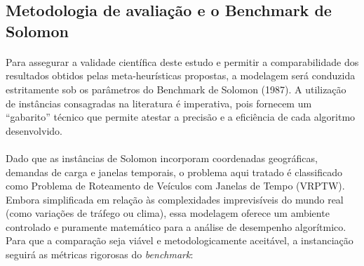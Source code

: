 \subsection{Metodologia de avaliação e o Benchmark de Solomon}
\label{sec:benchmark}

\paragraph{}Para assegurar a validade científica deste estudo e permitir a comparabilidade dos resultados obtidos pelas meta-heurísticas propostas, a modelagem será conduzida estritamente sob os parâmetros do Benchmark de Solomon (1987). A utilização de instâncias consagradas na literatura é imperativa, pois fornecem um ``gabarito'' técnico que permite atestar a precisão e a eficiência de cada algoritmo desenvolvido.

\paragraph{}Dado que as instâncias de Solomon incorporam coordenadas geográficas, demandas de carga e janelas temporais, o problema aqui tratado é classificado como Problema de Roteamento de Veículos com Janelas de Tempo (VRPTW). Embora simplificada em relação às complexidades imprevisíveis do mundo real (como variações de tráfego ou clima), essa modelagem oferece um ambiente controlado e puramente matemático para a análise de desempenho algorítmico. Para que a comparação seja viável e metodologicamente aceitável, a instanciação seguirá as métricas rigorosas do \textit{benchmark}:

